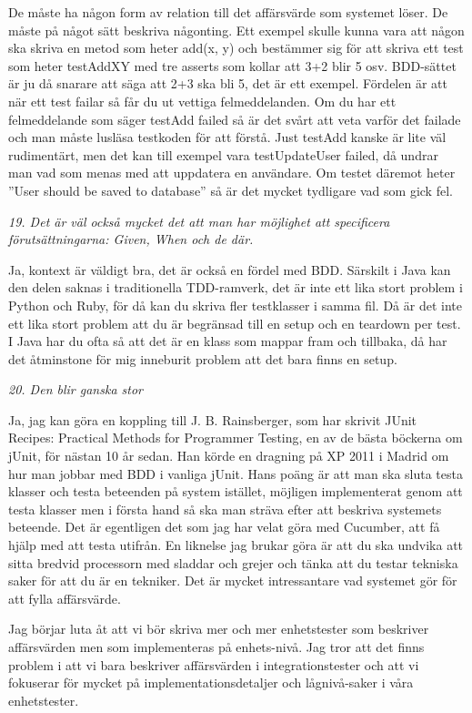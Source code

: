 \documentclass[11pt]{article}
\begin{document}
De måste ha någon form av relation till det affärsvärde som systemet löser. De måste på något sätt beskriva någonting. Ett exempel skulle kunna vara att någon ska skriva en metod som heter add(x, y) och bestämmer sig för att skriva ett test som heter testAddXY med tre asserts som kollar att 3+2 blir 5 osv. BDD-sättet är ju då snarare att säga att 2+3 ska bli 5, det är ett exempel. Fördelen är att när ett test failar så får du ut vettiga felmeddelanden. Om du har ett felmeddelande som säger testAdd failed så är det svårt att veta varför det failade och man måste lusläsa testkoden för att förstå. Just testAdd kanske är lite väl rudimentärt, men det kan till exempel vara testUpdateUser failed, då undrar man vad som menas med att uppdatera en användare. Om testet däremot heter ”User should be saved to database” så är det mycket tydligare vad som gick fel.

\emph{19. Det är väl också mycket det att man har möjlighet att specificera förutsättningarna: Given, When och de där.}

Ja, kontext är väldigt bra, det är också en fördel med BDD. Särskilt i Java kan den delen saknas i traditionella TDD-ramverk, det är inte ett lika stort problem i Python och Ruby, för då kan du skriva fler testklasser i samma fil. Då är det inte ett lika stort problem att du är begränsad till en setup och en teardown per test. I Java har du ofta så att det är en klass som mappar fram och tillbaka, då har det åtminstone för mig inneburit problem att det bara finns en setup.

\emph{20. Den blir ganska stor}

Ja, jag kan göra en koppling till J. B. Rainsberger, som har skrivit JUnit Recipes: Practical Methods for Programmer Testing, en av de bästa böckerna om jUnit, för nästan 10 år sedan. Han körde en dragning på XP 2011 i Madrid om hur man jobbar med BDD i vanliga jUnit. Hans poäng är att man ska sluta testa klasser och testa beteenden på system istället, möjligen implementerat genom att testa klasser men i första hand så ska man sträva efter att beskriva systemets beteende. Det är egentligen det som jag har velat göra med Cucumber, att få hjälp med att testa utifrån. En liknelse jag brukar göra är att du ska undvika att sitta bredvid processorn med sladdar och grejer och tänka att du testar tekniska saker för att du är en tekniker. Det är mycket intressantare vad systemet gör för att fylla affärsvärde.

Jag börjar luta åt att vi bör skriva mer och mer enhetstester som beskriver affärsvärden men som implementeras på enhets-nivå. Jag tror att det finns problem i att vi bara beskriver affärsvärden i integrationstester och att vi fokuserar för mycket på implementationsdetaljer och lågnivå-saker i våra enhetstester.
\end{document}
